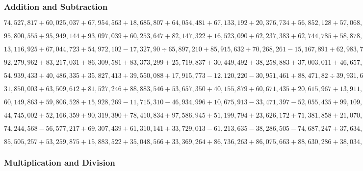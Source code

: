 \hypertarget{addition-and-subtraction-357}{%
\subsubsection{Addition and
Subtraction}\label{addition-and-subtraction-357}}

\(74,527,817+60,025,037+67,954,563+18,685,807+64,054,481+67,133,192+20,376,734+56,852,128+57,068,212+59,977,145\)

\(95,800,555+95,949,144+93,097,039+60,253,647+82,147,322+16,523,090+62,237,383+62,744,785+58,878,649+29,460,972\)

\(13,116,925+67,044,723+54,972,102-17,327,90÷65,897,210+85,915,632+70,268,261-15,167,891+62,983,789-69,862,446\)

\(92,279,962+83,217,031+86,309,581+83,373,299+25,719,837+30,449,492+38,258,883+37,003,011+46,657,796+54,078,076\)

\(54,939,433+40,486,335+35,827,413+39,550,088+17,915,773-12,120,220-30,951,461+88,471,82÷39,931,64÷10,813,070\)

\(31,850,003+63,509,612+81,527,246+88,883,546+53,657,350+40,155,879+60,671,435+20,615,967+13,911,421+29,754,930\)

\(60,149,863+59,806,528+15,928,269-11,715,310-46,934,996+10,675,913-33,471,397-52,055,435+99,109,997+55,518,121\)

\(44,745,002+52,166,359+90,319,390+78,410,834+97,586,945+51,199,794+23,626,172+71,381,858+21,070,654+67,989,421\)

\(74,244,568-56,577,217+69,307,439+61,310,141+33,729,013-61,213,635-38,286,505-74,687,247+37,634,100+30,713,297\)

\(85,505,257+53,259,875+15,883,522+35,048,566+33,369,264+86,736,263+86,075,663+88,630,286+38,034,243+38,094,239\)

\hypertarget{multiplication-and-division-356}{%
\subsubsection{Multiplication and
Division}\label{multiplication-and-division-356}}

